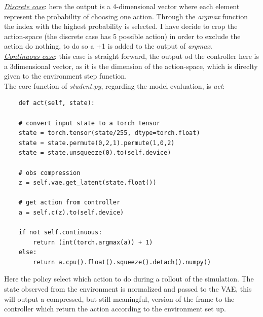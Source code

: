 \documentclass[10pt,a4paper]{article}
\begin{document}
\underline{\textit{Discrete case}}: here the output is a 4-dimensional vector where each element represent the probability of choosing one action. Through the \textit{argmax} function the index with the highest probability is selected. I have decide to crop the action-space (the discrete case has 5 possible action) in order to exclude the action do nothing, to do so a +1 is added to the output of \textit{argmax}.\\

\underline{\textit{Continuous case}}: this case is straight forward, the output od the controller here is a 3\-dimensional vector, as it is the dimension of the action-space, which is direclty given to the environment step function.\\

\noindent The core function of \textit{student.py}, regarding the model evaluation, is \textit{act}:
\begin{lstlisting}
    def act(self, state):

    # convert input state to a torch tensor
    state = torch.tensor(state/255, dtype=torch.float)
    state = state.permute(0,2,1).permute(1,0,2)
    state = state.unsqueeze(0).to(self.device)

    # obs compression
    z = self.vae.get_latent(state.float())
    
    # get action from controller
    a = self.c(z).to(self.device)   

    if not self.continuous:
        return (int(torch.argmax(a)) + 1)
    else:
        return a.cpu().float().squeeze().detach().numpy()
\end{lstlisting}

Here the policy select which action to do during a rollout of the simulation. The state observed from the environment is normalized and passed to the VAE, this will output a compressed, but still meaningful, version of the frame to the controller which return the action according to the environment set up.
\end{document}

